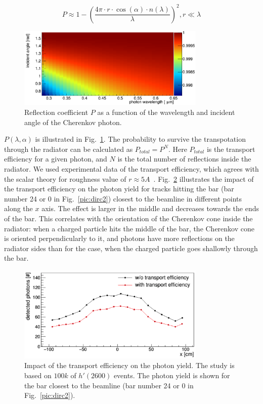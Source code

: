 \documentclass[11pt, a4paper]{article}
\begin{document}
\begin{equation}
P \approx  1 - \left( \frac{4\pi \cdot r \cdot \cos(\alpha) \cdot n(\lambda)}{\lambda} \right)^{2}, r \ll \lambda
\end{equation}

\begin{figure}[!h]
\centering
\includegraphics[width=0.8\textwidth]{pics/psurf.png}
\caption{\label{pic:sur}
Reflection coefficient $P$ as a function of the wavelength and incident angle of the Cherenkov photon.
}
\end{figure}

$P(\lambda,\alpha)$ is illustrated in Fig.~\ref{pic:sur}. The probability to survive the transpotation through the radiator can be calculated as $P_{total} = P^{N}$. Here $P_{total}$ is the transport efficiency for a given photon, and $N$ is the total number of reflections inside the radiator. We used experimental data of the transport efficiency, which agrees with the scalar theory for roughness value of $r \approx 5 A$~\cite{roughness}. Fig.~\ref{pic:tra} illustrates the impact of the transport efficiency on the photon yield for tracks hitting the bar (bar number 24 or 0 in Fig.~\ref{pic:dirc2}) closest to the beamline in different points along the $x$ axis. The effect is larger in the middle and decreases towards the ends of the bar. This correlates with the orientation of the Cherenkov cone inside the radiator: when a charged particle hits the middle of the bar, the Cherenkov cone is oriented perpendicularly to it, and photons have more reflections on the radiator sides than for the case, when the charged particle goes shallowly through the bar.

\begin{figure}[!h]
\centering
\includegraphics[width=0.8\textwidth]{pics/transport.png}
\caption{\label{pic:tra}
Impact of the transport efficiency on the photon yield. The study is based on $100k$ of $h'(2600)$ events. The photon yield is shown for the bar closest to the beamline (bar number 24 or 0 in Fig.~\ref{pic:dirc2}).
}
\end{figure}
\end{document}
